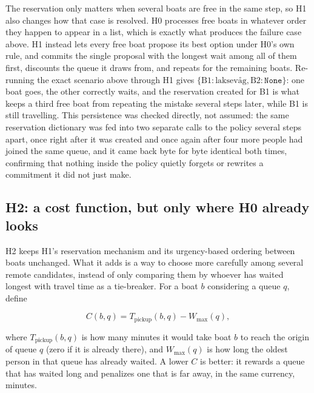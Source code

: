 \documentclass[11pt,a4paper]{article}
\begin{document}
The reservation only matters when several boats are free in the same step, so H1 also changes how that case is resolved. H0 processes free boats in whatever order they happen to appear in a list, which is exactly what produces the failure case above. H1 instead lets every free boat propose its best option under H0's own rule, and commits the single proposal with the longest wait among all of them first, discounts the queue it draws from, and repeats for the remaining boats. Re-running the exact scenario above through H1 gives $\{\text{B1}: \text{laksevåg}, \text{B2}: \texttt{None}\}$: one boat goes, the other correctly waits, and the reservation created for B1 is what keeps a third free boat from repeating the mistake several steps later, while B1 is still travelling. This persistence was checked directly, not assumed: the same reservation dictionary was fed into two separate calls to the policy several steps apart, once right after it was created and once again after four more people had joined the same queue, and it came back byte for byte identical both times, confirming that nothing inside the policy quietly forgets or rewrites a commitment it did not just make.

\subsection{H2: a cost function, but only where H0 already looks}
\label{sec:h2}

H2 keeps H1's reservation mechanism and its urgency-based ordering between boats unchanged. What it adds is a way to choose more carefully among several remote candidates, instead of only comparing them by whoever has waited longest with travel time as a tie-breaker. For a boat $b$ considering a queue $q$, define

\begin{equation}
C(b,q) = T_{\text{pickup}}(b,q) - W_{\max}(q),
\end{equation}

where $T_{\text{pickup}}(b,q)$ is how many minutes it would take boat $b$ to reach the origin of queue $q$ (zero if it is already there), and $W_{\max}(q)$ is how long the oldest person in that queue has already waited. A lower $C$ is better: it rewards a queue that has waited long and penalizes one that is far away, in the same currency, minutes.
\end{document}
